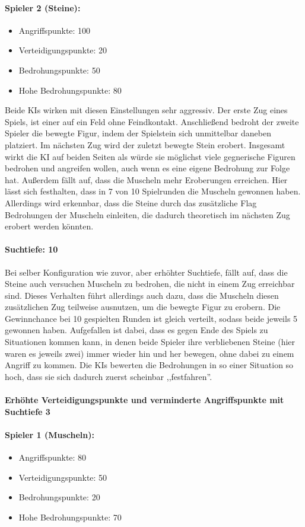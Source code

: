 \paragraph{Spieler 2 (Steine):}
\begin{itemize}
	\item Angriffspunkte: 100
	\item Verteidigungspunkte: 20
	\item Bedrohungspunkte: 50
	\item Hohe Bedrohungspunkte: 80
\end{itemize}
Beide KIs wirken mit diesen Einstellungen sehr aggressiv. Der erste Zug eines Spiels, ist einer auf ein Feld ohne Feindkontakt. Anschließend bedroht der zweite Spieler die bewegte Figur, indem der Spielstein sich unmittelbar daneben platziert. Im nächsten Zug wird der zuletzt bewegte Stein erobert. Insgesamt wirkt die KI auf beiden Seiten als würde sie möglichst viele gegnerische Figuren bedrohen und angreifen wollen, auch wenn es eine eigene Bedrohung zur Folge hat. Außerdem fällt auf, dass die Muscheln mehr Eroberungen erreichen. Hier lässt sich festhalten, dass in 7 von 10 Spielrunden die Muscheln gewonnen haben. Allerdings wird erkennbar, dass die Steine durch das zusätzliche Flag Bedrohungen der Muscheln einleiten, die dadurch theoretisch im nächsten Zug erobert werden könnten.
\paragraph{Suchtiefe: 10}
Bei selber Konfiguration wie zuvor, aber erhöhter Suchtiefe, fällt auf, dass die Steine  auch versuchen Muscheln zu bedrohen, die nicht in einem Zug erreichbar sind. Dieses Verhalten führt allerdings auch dazu, dass die Muscheln diesen zusätzlichen Zug teilweise ausnutzen, um die bewegte Figur zu erobern. Die Gewinnchance bei 10 gespielten Runden ist gleich verteilt, sodass beide jeweils 5 gewonnen haben. Aufgefallen ist dabei, dass es gegen Ende des Spiels zu Situationen kommen kann, in denen beide Spieler ihre verbliebenen Steine (hier waren es jeweils zwei) immer wieder hin und her bewegen, ohne dabei zu einem Angriff zu kommen. Die KIs bewerten die Bedrohungen in so einer Situation so hoch, dass sie sich dadurch zuerst scheinbar ,,festfahren''.
\paragraph{Erhöhte Verteidigungspunkte und verminderte Angriffspunkte mit Suchtiefe 3}
\paragraph{Spieler 1 (Muscheln):}
\begin{itemize}
	\item Angriffspunkte: 80
	\item Verteidigungspunkte: 50
	\item Bedrohungspunkte: 20
	\item Hohe Bedrohungspunkte: 70
\end{itemize}
